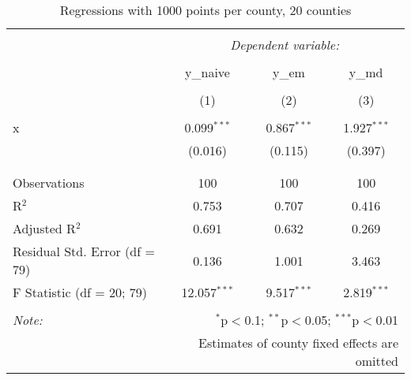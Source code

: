 
\begin{table}[!htbp] \centering 
  \caption{Regressions with 1000 points per county, 20 counties} 
  \label{} 
\begin{tabular}{@{\extracolsep{5pt}}lccc} 
\\[-1.8ex]\hline 
\hline \\[-1.8ex] 
 & \multicolumn{3}{c}{\textit{Dependent variable:}} \\ 
\cline{2-4} 
\\[-1.8ex] & y\_naive & y\_em & y\_md \\ 
\\[-1.8ex] & (1) & (2) & (3)\\ 
\hline \\[-1.8ex] 
 x & 0.099$^{***}$ & 0.867$^{***}$ & 1.927$^{***}$ \\ 
  & (0.016) & (0.115) & (0.397) \\ 
  & & & \\ 
\hline \\[-1.8ex] 
Observations & 100 & 100 & 100 \\ 
R$^{2}$ & 0.753 & 0.707 & 0.416 \\ 
Adjusted R$^{2}$ & 0.691 & 0.632 & 0.269 \\ 
Residual Std. Error (df = 79) & 0.136 & 1.001 & 3.463 \\ 
F Statistic (df = 20; 79) & 12.057$^{***}$ & 9.517$^{***}$ & 2.819$^{***}$ \\ 
\hline 
\hline \\[-1.8ex] 
\textit{Note:}  & \multicolumn{3}{r}{$^{*}$p$<$0.1; $^{**}$p$<$0.05; $^{***}$p$<$0.01} \\ 
 & \multicolumn{3}{r}{Estimates of county fixed effects are omitted} \\ 
\end{tabular} 
\end{table} 
